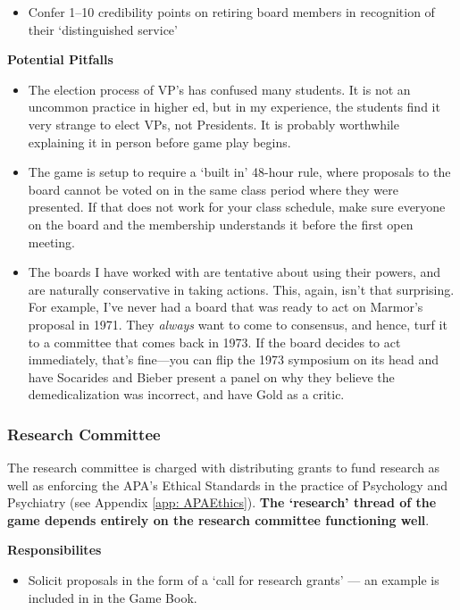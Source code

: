 \begin{refsection}
\begin{itemize}
\item Confer 1--10 credibility points on retiring board members in recognition of their ‘distinguished service’

\end{itemize}

\textbf{Potential Pitfalls}

\begin{itemize}
\item The election process of VP's has confused many students. It is not an uncommon practice in higher ed, but in my experience, the students find it very strange to elect VPs, not Presidents. It is probably worthwhile explaining it in person before game play begins.

\item The game is setup to require a `built in' 48-hour rule, where proposals to the board cannot be voted on in the same class period where they were presented. If that does not work for your class schedule, make sure everyone on the board and the membership understands it before the first open meeting.

\item The boards I have worked with are tentative about using their powers, and are naturally conservative in taking actions. This, again, isn't that surprising. For example, I've never had a board that was ready to act on Marmor's proposal in 1971. They \emph{always} want to come to consensus, and hence, turf it to a committee that comes back in 1973. If the board decides to act immediately, that's fine---you can flip the 1973 symposium on its head and have Socarides and Bieber present a panel on why they believe the demedicalization was incorrect, and have Gold as a critic.

\end{itemize}

\subsubsection{Research Committee}
\label{researchcommittee}

The research committee is charged with distributing grants to fund research as well as enforcing the APA's Ethical Standards in the practice of Psychology and Psychiatry (see Appendix \ref{app: APAEthics}). \textbf{The ‘research’ thread of the game depends entirely on the research committee functioning well}. 

\textbf{Responsibilites}

\begin{itemize}
\item Solicit proposals in the form of a `call for research grants' --- an example is included in  in the Game Book.


\end{itemize}
\end{refsection}
